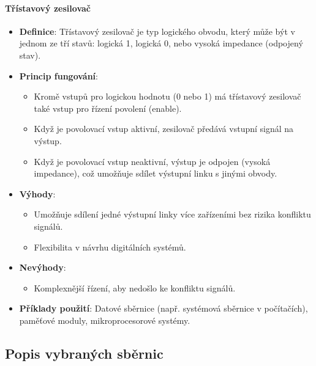 \paragraph{Třístavový zesilovač}
\begin{itemize}
    \item \textbf{Definice}: Třístavový zesilovač je typ logického obvodu, který může být v jednom ze tří stavů: logická 1, logická 0, nebo vysoká impedance (odpojený stav).
    \item \textbf{Princip fungování}:
    \begin{itemize}
        \item Kromě vstupů pro logickou hodnotu (0 nebo 1) má třístavový zesilovač také vstup pro řízení povolení (enable).
        \item Když je povolovací vstup aktivní, zesilovač předává vstupní signál na výstup.
        \item Když je povolovací vstup neaktivní, výstup je odpojen (vysoká impedance), což umožňuje sdílet výstupní linku s jinými obvody.
    \end{itemize}
    \item \textbf{Výhody}:
    \begin{itemize}
        \item Umožňuje sdílení jedné výstupní linky více zařízeními bez rizika konfliktu signálů.
        \item Flexibilita v návrhu digitálních systémů.
    \end{itemize}
    \item \textbf{Nevýhody}:
    \begin{itemize}
        \item Komplexnější řízení, aby nedošlo ke konfliktu signálů.
    \end{itemize}
    \item \textbf{Příklady použití}: Datové sběrnice (např. systémová sběrnice v počítačích), paměťové moduly, mikroprocesorové systémy.
\end{itemize}

\subsection{Popis vybraných sběrnic}
